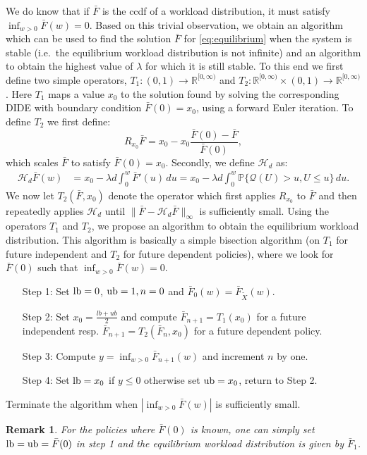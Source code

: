 \documentclass[12pt]{report}
\renewcommand{\P}{\mathbb{P}}
\newcommand{\QQ}{\mathcal{Q}}
\renewcommand{\P}{\mathbb{P}}
\newtheorem{remark}{Remark}
\begin{document}
We do know that if $\bar F$ is the ccdf of a workload distribution, it must satisfy $\inf_{w > 0} \bar F(w)=0$. Based on this trivial observation, we obtain an algorithm which can be used to find the solution $\bar{F}$ for \eqref{eq:equilibrium} when the system is stable (i.e.~the equilibrium workload distribution is not infinite) and an algorithm to obtain the highest value of $\lambda$ for which it is still stable. To this end we first define two simple operators, $T_1:(0,1) \rightarrow \mathbb{R}^{[0,\infty)}$ and $T_2: \mathbb{R}^{[0,\infty)} \times (0,1) \rightarrow \mathbb{R}^{[0,\infty)}$. Here $T_1$ maps a value $x_0$ to the solution found by solving the corresponding DIDE with boundary condition $\bar F(0) = x_0$, using a forward Euler iteration. To define $T_2$ we first define: 
$$
R_{x_0} \bar F = x_0 - x_0 \frac{\bar F(0) - \bar F}{\bar F(0)},
$$
which scales $\bar F$ to satisfy $\bar F(0)=x_0$. Secondly, we define $\mathcal{H}_d$ as:
\begin{align*}
\mathcal{H}_d \bar F (w) &= x_0 -\lambda d \int_0^w \bar F'(u) \, du = x_0 -\lambda d \int_0^w \P\{\QQ(U) > u, U \leq u\}\, du.
\end{align*}
We now let $T_2(\bar F, x_0)$ denote the operator which first applies $R_{x_0}$ to $\bar F$ and then repeatedly applies $\mathcal{H}_d$ until $\|\bar F - \mathcal{H}_d \bar F\|_{\infty}$ is sufficiently small. Using the operators $T_1$ and $T_2$, we propose an algorithm to obtain the equilibrium workload distribution.  This algorithm is basically a simple bisection algorithm (on $T_1$ for future independent and $T_2$ for future dependent policies), where we look for $\bar F(0)$ such that $\inf_{w>0} \bar F(w)=0$.
\begin{itemize}
\item[Step 1: ] Set $\textup{lb}=0$, $\textup{ub}=1, n =0$ and $\bar F_0(w)=\bar F_{\tilde X}(w)$.
\item[Step 2: ] Set $x_0=\frac{lb+ub}{2}$ and compute $\bar F_{n+1} = T_1(x_0)$ for a future independent resp. $\bar F_{n+1} = T_2(\bar F_n, x_0)$ for a future dependent policy.
\item[Step 3: ] Compute $y=\inf_{w>0} \bar F_{n+1}(w)$ and increment $n$ by one.
\item[Step 4: ] Set $\textup{lb}=x_0$ if $y\leq 0$ otherwise set $\textup{ub}=x_0$, return to Step 2.
\end{itemize}
Terminate the algorithm when $|\inf_{w>0} \bar F(w)|$ is sufficiently small.
\begin{remark}
For the policies where $\bar F(0)$ is known, one can simply set $\textup{lb}=\textup{ub}=\bar F(0)$ in step 1 and the equilibrium workload distribution is given by $\bar F_1$.
\end{remark}
\end{document}
